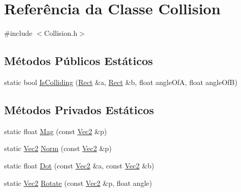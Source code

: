 \hypertarget{classCollision}{\section{Referência da Classe Collision}
\label{classCollision}
}


{\ttfamily \#include $<$Collision.\+h$>$}

\subsection*{Métodos Públicos Estáticos}
\begin{DoxyCompactItemize}
\item 
static bool \hyperlink{classCollision_a8bfb131379c86c409bf38c68ef25fae6}{Is\+Colliding} (\hyperlink{classRect}{Rect} \&a, \hyperlink{classRect}{Rect} \&b, float angle\+Of\+A, float angle\+Of\+B)
\end{DoxyCompactItemize}
\subsection*{Métodos Privados Estáticos}
\begin{DoxyCompactItemize}
\item 
static float \hyperlink{classCollision_a0c594c1d2a6733d602c39c1d11e410ad}{Mag} (const \hyperlink{classVec2}{Vec2} \&p)
\item 
static \hyperlink{classVec2}{Vec2} \hyperlink{classCollision_ab739e01f1393b68b28cb8b45f42bf2d4}{Norm} (const \hyperlink{classVec2}{Vec2} \&p)
\item 
static float \hyperlink{classCollision_a8e858eea6ac033ac5e2a31946618c5c4}{Dot} (const \hyperlink{classVec2}{Vec2} \&a, const \hyperlink{classVec2}{Vec2} \&b)
\item 
static \hyperlink{classVec2}{Vec2} \hyperlink{classCollision_af6176da5535324240ccf1557910ac89e}{Rotate} (const \hyperlink{classVec2}{Vec2} \&p, float angle)
\end{DoxyCompactItemize}


